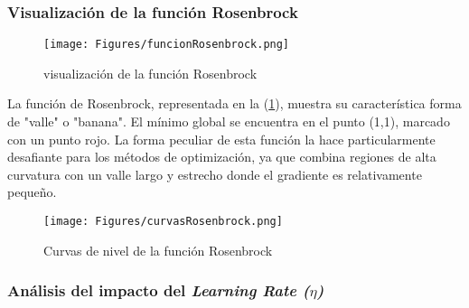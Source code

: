 \documentclass{tp02}
\begin{document}
\subsubsection{Visualización de la función Rosenbrock}

\begin{figure}[H]
    \centering
    \texttt{[image: Figures/funcionRosenbrock.png]}
    \caption{visualización de la función Rosenbrock}
    \label{fig:Función Rosenbrock}
    \end{figure}

La función de Rosenbrock, representada en la (\ref{fig:Función Rosenbrock}),
muestra su característica forma de "valle" o "banana". 
El mínimo global se encuentra en el punto (1,1), marcado
con un punto rojo. La forma peculiar de esta función la hace 
particularmente desafiante para los métodos de optimización, ya que combina 
regiones de alta curvatura con un valle largo y estrecho donde el gradiente es 
relativamente pequeño.

    \begin{figure}[H]
        \centering
        \texttt{[image: Figures/curvasRosenbrock.png]}
        \caption{Curvas de nivel de la función Rosenbrock}
        \label{fig:Curvas de nivel de la función Rosenbrock}
        \end{figure}

\subsubsection{Análisis del impacto del \textit{Learning Rate ($\eta$)}}
\end{document}
